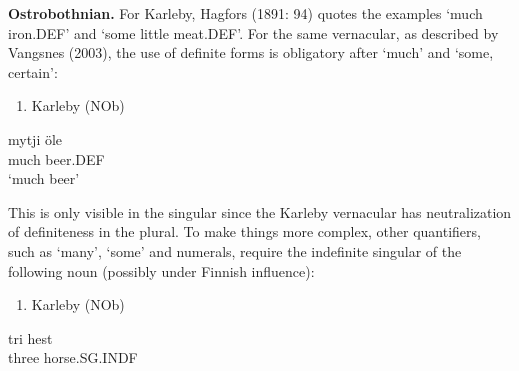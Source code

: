 \textbf{Ostrobothnian.} For Karleby, Hagfors (1891: 94) quotes the examples  ‘much iron.DEF’ and  ‘some little meat.DEF’. For the same vernacular, as described by Vangsnes (2003), the use of definite forms is obligatory after  ‘much’ and  ‘some, certain’:

\begin{enumerate} %
\item 
Karleby (NOb)

\end{enumerate} %
\ea\label{}
\gll mytji  öle\\


much  beer.DEF\\ %


‘much beer’
\z


This is only visible in the singular since the Karleby vernacular has neutralization of definiteness in the plural. To make things more complex, other quantifiers, such as  ‘many’,  ‘some’ and numerals, require the indefinite singular of the following noun (possibly under Finnish influence):

\begin{enumerate} %
\item 
Karleby (NOb)

\end{enumerate} %
\ea\label{}
\gll tri  hest\\


three  horse.SG.INDF\\ %


